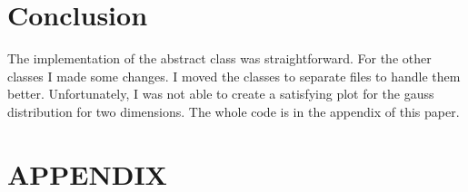 \documentclass[10pt, a4paper, twocolumn]{article} %
\begin{document}
\section{Conclusion}
The implementation of the abstract class was straightforward. For the other classes I made some changes. I moved the classes to separate files to handle them better. Unfortunately, I was not able to create a satisfying plot for the gauss distribution for two dimensions. The whole code is in the appendix of this paper. 

\section*{APPENDIX}
\onecolumn
\onecolumn
\onecolumn
\onecolumn




\printbibliography[title={Bibliography}] %

\end{document}
